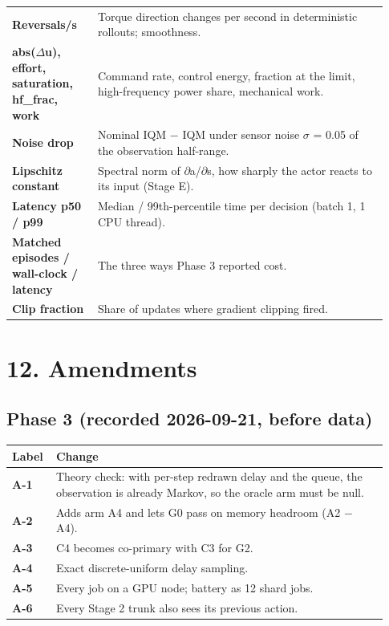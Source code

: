 \documentclass[11pt]{article}
\begin{document}
\begin{center}
\begin{tabular}{>{\raggedright\arraybackslash}p{0.217\linewidth}>{\raggedright\arraybackslash}p{0.717\linewidth}}
\textbf{Reversals/s} & Torque direction changes per second in deterministic rollouts; smoothness. \\
\textbf{abs($\Delta$u), effort, saturation, hf\_frac, work} & Command rate, control energy, fraction at the limit, high-frequency power share, mechanical work. \\
\textbf{Noise drop} & Nominal IQM $-$ IQM under sensor noise $\sigma$ = 0.05 of the observation half-range. \\
\textbf{Lipschitz constant} & Spectral norm of $\partial$a/$\partial$s, how sharply the actor reacts to its input (Stage E). \\
\textbf{Latency p50 / p99} & Median / 99th-percentile time per decision (batch 1, 1 CPU thread). \\
\textbf{Matched episodes / wall-clock / latency} & The three ways Phase 3 reported cost. \\
\textbf{Clip fraction} & Share of updates where gradient clipping fired. \\
\bottomrule
\end{tabular}\end{center}



\section*{12. Amendments}



\subsection*{Phase 3 (recorded 2026-09-21, before data)}



\begin{center}\small\begin{tabular}{>{\raggedright\arraybackslash}p{0.092\linewidth}>{\raggedright\arraybackslash}p{0.842\linewidth}}
\toprule
Label & Change \\
\midrule
\textbf{A-1} & Theory check: with per-step redrawn delay and the queue, the observation is already Markov, so the oracle arm must be null. \\
\textbf{A-2} & Adds arm A4 and lets G0 pass on memory headroom (A2 $-$ A4). \\
\textbf{A-3} & C4 becomes co-primary with C3 for G2. \\
\textbf{A-4} & Exact discrete-uniform delay sampling. \\
\textbf{A-5} & Every job on a GPU node; battery as 12 shard jobs. \\
\textbf{A-6} & Every Stage 2 trunk also sees its previous action. \\
\bottomrule
\end{tabular}\end{center}
\end{document}
